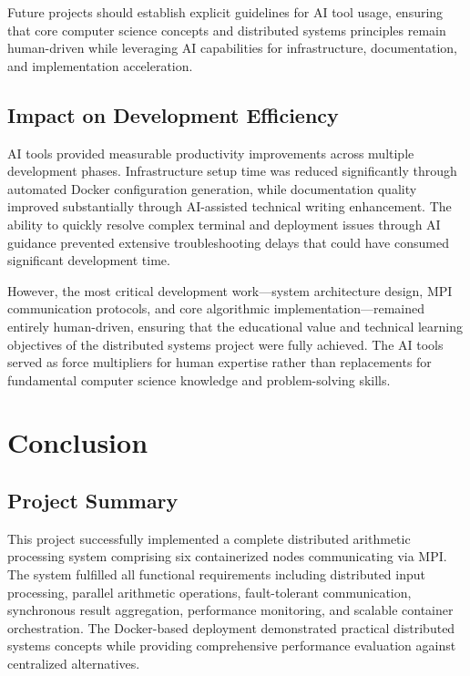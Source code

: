 \documentclass{article}
\begin{document}
Future projects should establish explicit guidelines for AI tool usage, ensuring that core computer science concepts and distributed systems principles remain human-driven while leveraging AI capabilities for infrastructure, documentation, and implementation acceleration.

\subsection{Impact on Development Efficiency}

AI tools provided measurable productivity improvements across multiple development phases. Infrastructure setup time was reduced significantly through automated Docker configuration generation, while documentation quality improved substantially through AI-assisted technical writing enhancement. The ability to quickly resolve complex terminal and deployment issues through AI guidance prevented extensive troubleshooting delays that could have consumed significant development time.

However, the most critical development work—system architecture design, MPI communication protocols, and core algorithmic implementation—remained entirely human-driven, ensuring that the educational value and technical learning objectives of the distributed systems project were fully achieved. The AI tools served as force multipliers for human expertise rather than replacements for fundamental computer science knowledge and problem-solving skills.


\section{Conclusion}

\subsection{Project Summary}
This project successfully implemented a complete distributed arithmetic processing system comprising six containerized nodes communicating via MPI. The system fulfilled all functional requirements including distributed input processing, parallel arithmetic operations, fault-tolerant communication, synchronous result aggregation, performance monitoring, and scalable container orchestration. The Docker-based deployment demonstrated practical distributed systems concepts while providing comprehensive performance evaluation against centralized alternatives.
\end{document}
